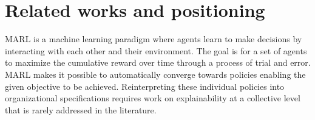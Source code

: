 \documentclass[doubleblind]{ecai}
\begin{document}


\section{Related works and positioning}



MARL is a machine learning paradigm where agents learn to make decisions by interacting with each other and their environment. The goal is for a set of agents to maximize the cumulative reward over time through a process of trial and error.
MARL makes it possible to automatically converge towards policies enabling the given objective to be achieved. Reinterpreting these individual policies into organizational specifications requires work on explainability at a collective level that is rarely addressed in the literature.




\end{document}

